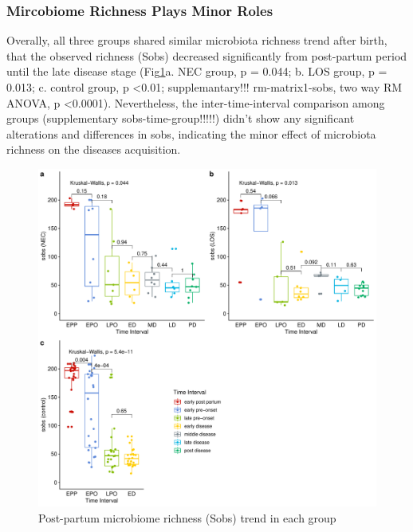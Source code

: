 \documentclass[fleqn,10pt,lineno]{wlpeerj} %
\begin{document}
    \subsubsection*{Mircobiome Richness Plays Minor Roles}
    Overally, all three groups shared similar microbiota richness trend after birth, that the observed richness (Sobs) decreased significantly from post-partum period until the late disease stage (Fig\ref{fig:sobs-group-time}a. NEC group, p = 0.044; b. LOS group, p = 0.013; c. control group, p \textless 0.01; supplemantary!!! rm-matrix1-sobs, two way RM ANOVA, p \textless 0.0001). Nevertheless, the inter-time-interval comparison among groups (supplementary sobs-time-group!!!!!) didn't show any significant alterations and differences in sobs, indicating the minor effect of microbiota richness on the diseases acquisition.
      \begin{figure}[ht]\centering
        \includegraphics[width=\linewidth]{figure/sobs-group-time.pdf}
        \caption{Post-partum microbiome richness (Sobs) trend in each group}
        \label{fig:sobs-group-time}
      \end{figure}
\end{document}
